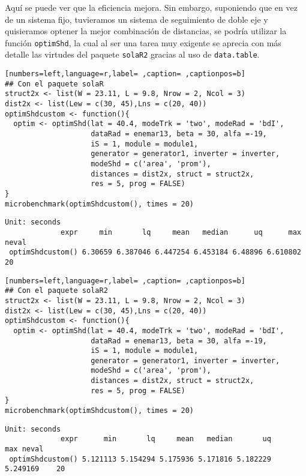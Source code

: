 \begin{itemize}
Aquí se puede ver que la eficiencia mejora. Sin embargo, suponiendo que en vez de un sistema fijo, tuvieramos un sistema de seguimiento de doble eje y quisieramos optener la mejor combinación de distancias, se podría utilizar la función \texttt{optimShd}, la cual al ser una tarea muy exigente se aprecia con más detalle las virtudes del paquete \texttt{solaR2} gracias al uso de \texttt{data.table}.
\begin{lstlisting}[numbers=left,language=r,label= ,caption= ,captionpos=b]
## Con el paquete solaR
struct2x <- list(W = 23.11, L = 9.8, Nrow = 2, Ncol = 3)
dist2x <- list(Lew = c(30, 45),Lns = c(20, 40))
optimShdcustom <- function(){  
  optim <- optimShd(lat = 40.4, modeTrk = 'two', modeRad = 'bdI',
                    dataRad = enemar13, beta = 30, alfa =-19,
                    iS = 1, module = module1,
                    generator = generator1, inverter = inverter,
                    modeShd = c('area', 'prom'),
                    distances = dist2x, struct = struct2x,
                    res = 5, prog = FALSE)
}
microbenchmark(optimShdcustom(), times = 20)
\end{lstlisting}

\begin{verbatim}
Unit: seconds
             expr     min       lq     mean   median      uq      max neval
 optimShdcustom() 6.30659 6.387046 6.447254 6.453184 6.48896 6.610802    20
\end{verbatim}


\begin{lstlisting}[numbers=left,language=r,label= ,caption= ,captionpos=b]
## Con el paquete solaR2
struct2x <- list(W = 23.11, L = 9.8, Nrow = 2, Ncol = 3)
dist2x <- list(Lew = c(30, 45),Lns = c(20, 40))
optimShdcustom <- function(){  
  optim <- optimShd(lat = 40.4, modeTrk = 'two', modeRad = 'bdI',
                    dataRad = enemar13, beta = 30, alfa =-19,
                    iS = 1, module = module1,
                    generator = generator1, inverter = inverter,
                    modeShd = c('area', 'prom'),
                    distances = dist2x, struct = struct2x,
                    res = 5, prog = FALSE)
}
microbenchmark(optimShdcustom(), times = 20)
\end{lstlisting}

\begin{verbatim}
Unit: seconds
             expr      min       lq     mean   median       uq      max neval
 optimShdcustom() 5.121113 5.154294 5.175936 5.171816 5.182229 5.249169    20
\end{verbatim}
\end{itemize}
